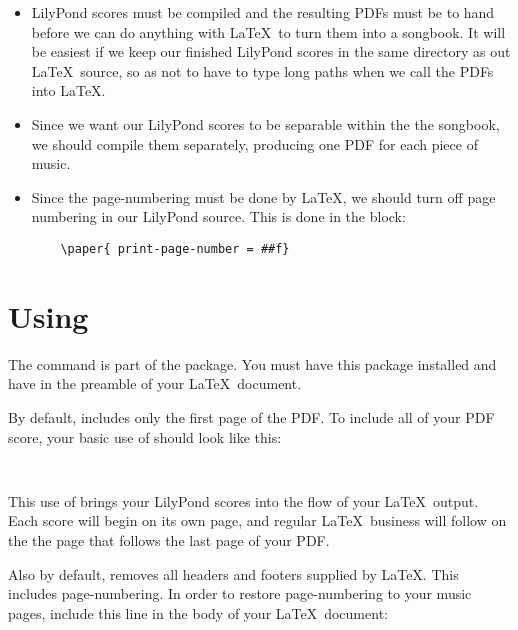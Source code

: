 \documentclass[../../LilyPond-Tutorials]{subfiles}
\begin{document}
\begin{itemize}

\item  LilyPond scores must be compiled and the resulting PDFs must be to hand before we can do anything with \LaTeX\ to turn them into a songbook. 
It will be easiest if we keep our finished LilyPond scores in the same directory as out \LaTeX\ source, so as not to have to type long paths when we call the PDFs into \LaTeX.  

\item  Since we want our LilyPond scores to be separable within the the songbook, we should compile them separately, producing one PDF for each piece of music.  

\item  Since the page-numbering must be done by \LaTeX, we should turn off page numbering in our LilyPond source. 
This is done in the  block:

\begin{verbatim}
	\paper{ print-page-number = ##f} 
\end{verbatim}

\end{itemize}

\section{Using }

The  command is part of the  package. 
You must have this package installed and have  in the preamble of your \LaTeX\ document.

By default,  includes only the first page of the PDF. 
To include all of your PDF score, your basic use of  should look like this:

\begin{verbatim}
	
\end{verbatim}

This use of  brings your LilyPond scores into the flow of your \LaTeX\ output. 
Each score will begin on its own page, and regular \LaTeX\ business will follow on the the page that follows the last page of your PDF.

Also by default,  removes all headers and footers supplied by \LaTeX. 
This includes page-numbering. 
In order to restore page-numbering to your music pages, include this line in the body of your \LaTeX\ document:
\end{document}

